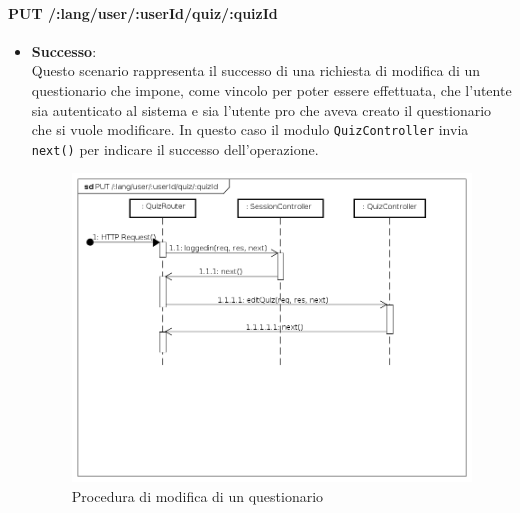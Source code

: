 \paragraph{PUT /:lang/user/:userId/quiz/:quizId} %
\begin{itemize}
\item \textbf{Successo}:\\
Questo scenario rappresenta il successo di una richiesta di modifica di un questionario che impone, come vincolo per poter essere effettuata, che l'utente sia autenticato al sistema e sia l'utente pro che aveva creato il questionario che si vuole modificare. In questo caso il modulo \texttt{QuizController} invia \texttt{next()} per indicare il successo dell'operazione.
\label{Procedura di modifica di un questionario}
\begin{figure}[ht]
	\centering
	\includegraphics[scale=0.40]{UML/DiagrammiDiSequenza/Back-end/PUT__lang_user_userId_quiz_quizId_success.png}
	\caption{Procedura di modifica di un questionario}
\end{figure}
\FloatBarrier


\end{itemize}
